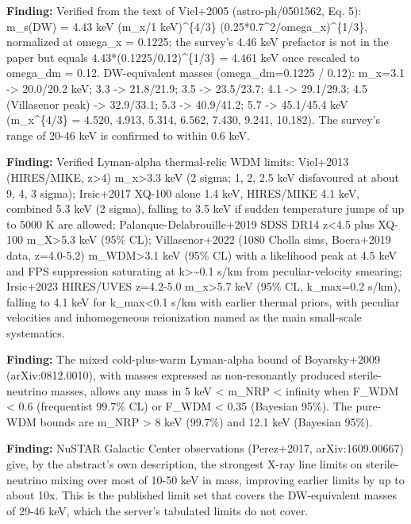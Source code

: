 \documentclass[11pt,a4paper]{article}
\begin{document}
\textbf{Finding:} Verified from the text of Viel+2005 (astro-ph/0501562, Eq. 5): m\_s(DW) = 4.43 keV (m\_x/1 keV)\textasciicircum{}\{4/3\} (0.25*0.7\textasciicircum{}2/omega\_x)\textasciicircum{}\{1/3\}, normalized at omega\_x = 0.1225; the survey's 4.46 keV prefactor is not in the paper but equals 4.43*(0.1225/0.12)\textasciicircum{}\{1/3\} = 4.461 keV once rescaled to omega\_dm = 0.12. DW-equivalent masses (omega\_dm=0.1225 / 0.12): m\_x=3.1 -\textgreater{} 20.0/20.2 keV; 3.3 -\textgreater{} 21.8/21.9; 3.5 -\textgreater{} 23.5/23.7; 4.1 -\textgreater{} 29.1/29.3; 4.5 (Villasenor peak) -\textgreater{} 32.9/33.1; 5.3 -\textgreater{} 40.9/41.2; 5.7 -\textgreater{} 45.1/45.4 keV (m\_x\textasciicircum{}\{4/3\} = 4.520, 4.913, 5.314, 6.562, 7.430, 9.241, 10.182). The survey's range of 20-46 keV is confirmed to within 0.6 keV.

\textbf{Finding:} Verified Lyman-alpha thermal-relic WDM limits: Viel+2013 (HIRES/MIKE, z\textgreater{}4) m\_x\textgreater{}3.3 keV (2 sigma; 1, 2, 2.5 keV disfavoured at about 9, 4, 3 sigma); Irsic+2017 XQ-100 alone 1.4 keV, HIRES/MIKE 4.1 keV, combined 5.3 keV (2 sigma), falling to 3.5 keV if sudden temperature jumps of up to 5000 K are allowed; Palanque-Delabrouille+2019 SDSS DR14 z\textless{}4.5 plus XQ-100 m\_X\textgreater{}5.3 keV (95\% CL); Villasenor+2022 (1080 Cholla sims, Boera+2019 data, z=4.0-5.2) m\_WDM\textgreater{}3.1 keV (95\% CL) with a likelihood peak at 4.5 keV and FPS suppression saturating at k\textgreater{}\textasciitilde{}0.1 s/km from peculiar-velocity smearing; Irsic+2023 HIRES/UVES z=4.2-5.0 m\_x\textgreater{}5.7 keV (95\% CL, k\_max=0.2 s/km), falling to 4.1 keV for k\_max\textless{}0.1 s/km with earlier thermal priors, with peculiar velocities and inhomogeneous reionization named as the main small-scale systematics.

\textbf{Finding:} The mixed cold-plus-warm Lyman-alpha bound of Boyarsky+2009 (arXiv:0812.0010), with masses expressed as non-resonantly produced sterile-neutrino masses, allows any mass in 5 keV \textless{} m\_NRP \textless{} infinity when F\_WDM \textless{} 0.6 (frequentist 99.7\% CL) or F\_WDM \textless{} 0.35 (Bayesian 95\%). The pure-WDM bounds are m\_NRP \textgreater{} 8 keV (99.7\%) and 12.1 keV (Bayesian 95\%).

\textbf{Finding:} NuSTAR Galactic Center observations (Perez+2017, arXiv:1609.00667) give, by the abstract's own description, the strongest X-ray line limits on sterile-neutrino mixing over most of 10-50 keV in mass, improving earlier limits by up to about 10x. This is the published limit set that covers the DW-equivalent masses of 29-46 keV, which the server's tabulated limits do not cover.
\end{document}
